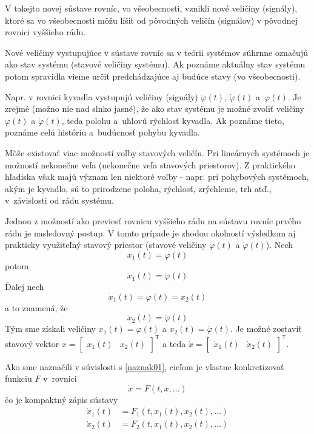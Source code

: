 \documentclass[a4paper, 10pt, ]{article}
\begin{document}
V takejto novej sústave rovníc, vo všeobecnosti, vznikli nové veličiny (signály), ktoré sa vo všeobecnosti môžu líšiť od pôvodných veličín (signálov) v pôvodnej rovnici vyššieho rádu.

Nové veličiny vystupujúce v sústave rovníc sa v teórii systémov súhrnne označujú ako stav systému (stavové veličiny systému). Ak poznáme aktuálny stav systému potom spravidla vieme určiť predchádzajúce aj budúce stavy (vo všeobecnosti).

Napr. v rovnici kyvadla vystupujú veličiny (signály) $\ddot \varphi(t)$, $\dot \varphi(t)$ a~$\varphi(t)$. Je zrejmé (možno nie nad slnko jasné), že ako stav systému je možné zvoliť veličiny $\varphi(t)$ a $\dot \varphi(t)$, teda polohu a~uhlovú rýchlosť kyvadla. Ak poznáme tieto, poznáme celú históriu a~budúcnosť pohybu kyvadla.

Môže existovať viac možností voľby stavových veličín. Pri lineárnych systémoch je možností nekonečne veľa (nekonečne veľa stavových priestorov). Z praktického hľadiska však majú význam len niektoré voľby - napr. pri pohybových systémoch, akým je kyvadlo, sú to prirodzene poloha, rýchlosť, zrýchlenie, trh atď., v~závislosti od rádu systému.


Jednou z možností ako previesť rovnicu vyššieho rádu na sústavu rovníc prvého rádu je nasledovný postup. V tomto prípade je zhodou okolností výsledkom aj prakticky využiteľný stavový priestor (stavové veličiny $\varphi(t)$ a $\dot \varphi(t)$). Nech
\begin{equation}
    x_1(t) = \varphi(t)
\end{equation}
potom
\begin{equation}
    \dot x_1(t) = \dot \varphi(t)
\end{equation}
Ďalej nech
\begin{equation}
    \dot x_1(t) = \dot \varphi(t) = x_2(t)
\end{equation}
a to znamená, že
\begin{equation}
    \dot x_2(t) = \ddot \varphi(t)
\end{equation}
Tým sme získali veličiny $x_1(t) = \varphi(t)$ a $x_2(t) = \dot \varphi(t)$. Je možné zostaviť stavový vektor $x = \begin{bmatrix} x_1(t) & x_2(t) \end{bmatrix}^\mathsf T$ a teda $\dot x = \begin{bmatrix} \dot x_1(t) & \dot x_2(t) \end{bmatrix}^\mathsf T$.

Ako sme naznačili v súvislosti s \eqref{naznak01}, cieľom je vlastne konkretizovať funkciu $F$ v~rovnici
\begin{equation}
    \dot x = F(t, x, \ldots)
\end{equation}
čo je kompaktný zápis sústavy
\begin{align}
    \dot x_1(t) &= F_1 \left(t, x_1(t), x_2(t), \ldots \right) \\
    \dot x_2(t) &= F_2 \left(t, x_1(t), x_2(t), \ldots \right)
\end{align}
\end{document}
